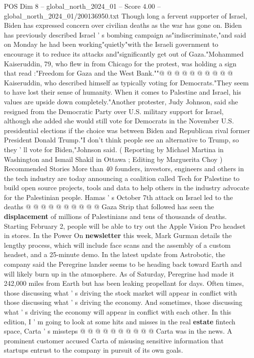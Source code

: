 \begin{textsample}{POS Dim 8 – global\_north\_2024\_01 – Score 4.00 – global\_north\_2024\_01/200136950.txt}
Though long a fervent supporter of Israel, Biden has expressed concern over civilian deaths as the war has gone on.
Biden has previously described Israel ' s bombing campaign as"indiscriminate,"and said on Monday he had been working"quietly"with the Israeli government to encourage it to reduce its attacks and"significantly get out of Gaza."Mohammed Kaiseruddin, 79, who flew in from Chicago for the protest, was holding a sign that read :"Freedom for Gaza and the West Bank.""@ @ @ @ @ @ @ @ @ @ Kaiseruddin, who described himself as typically voting for Democrats."They seem to have lost their sense of humanity.
When it comes to Palestine and Israel, his values are upside down completely."Another protester, Judy Johnson, said she resigned from the Democratic Party over U.S. military support for Israel, although she added she would still vote for Democrats in the November U.S. presidential elections if the choice was between Biden and Republican rival former President Donald Trump."I don't think people see an alternative to Trump, so they ' ll vote for Biden,"Johnson said. ( Reporting by Michael Martina in Washington and Ismail Shakil in Ottawa ; Editing by Marguerita Choy ) Recommended Stories More than 40 founders, investors, engineers and others in the tech industry are today announcing a coalition called Tech for Palestine to build open source projects, tools and data to help others in the industry advocate for the Palestinian people.
Hamas ' s October 7th attack on Israel led to the deaths @ @ @ @ @ @ @ @ @ @ Gaza Strip that followed has seen the \textbf{displacement} of millions of Palestinians and tens of thousands of deaths.
Starting February 2, people will be able to try out the Apple Vision Pro headset in stores.
In the Power On \textbf{newsletter} this week, Mark Gurman details the lengthy process, which will include face scans and the assembly of a custom headset, and a 25-minute demo.
In the latest update from Astrobotic, the company said the Peregrine lander seems to be heading back toward Earth and will likely burn up in the atmosphere.
As of Saturday, Peregrine had made it 242,000 miles from Earth but has been leaking propellant for days.
Often times, those discussing what ' s driving the stock market will appear in conflict with those discussing what ' s driving the economy.
And sometimes, those discussing what ' s driving the economy will appear in conflict with each other.
In this edition, I ' m going to look at some hits and misses in the real \textbf{estate} fintech space, Carta ' s missteps @ @ @ @ @ @ @ @ @ @ Carta was in the news.
A prominent customer accused Carta of misusing sensitive information that startups entrust to the company in pursuit of its own goals.

\end{textsample}
